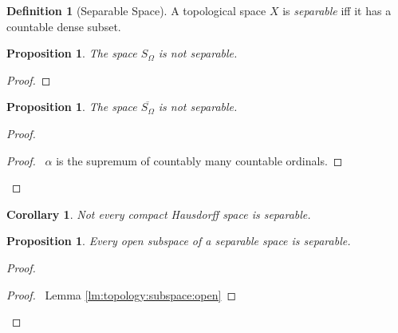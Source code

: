 \documentclass{report}
\let\qed\relax
\newtheorem{prop}[lm]{Proposition}
\newtheorem{cor}{Corollary}[lm]
\theoremstyle{definition}
\newtheorem{df}[lm]{Definition}
\begin{document}
    \begin{df}[Separable Space]
    A topological space $X$ is \emph{separable} iff it has a countable dense
    subset.
  \end{df}

    \begin{prop}
      \label{prop:topology:separable:S_omega}
   The space $S_\Omega$ is not separable.
  \end{prop}

  \begin{proof}
   \pf
   \step{<1>3}{$\overline{D} \subseteq (-\infty, \alpha]$}
   \qed
  \end{proof}

    \begin{prop}
    The space $\overline{S_\Omega}$ is not separable.
  \end{prop}

  \begin{proof}
   \pf
   \begin{proof}
     \pf\ $\alpha$ is the supremum of countably many countable ordinals.
   \end{proof}
   \step{<1>4}{$\overline{D} \subseteq (-\infty, \alpha] \cup \{ \Omega \}$}
   \qed
  \end{proof}

  \begin{cor}
    Not every compact Hausdorff space is separable.
  \end{cor}

  \begin{prop}
    Every open subspace of a separable space is separable.
  \end{prop}

  \begin{proof}
    \pf
    \begin{proof}
      \pf\ Lemma \ref{lm:topology:subspace:open}
    \end{proof}
    \qed
  \end{proof}
\end{document}
